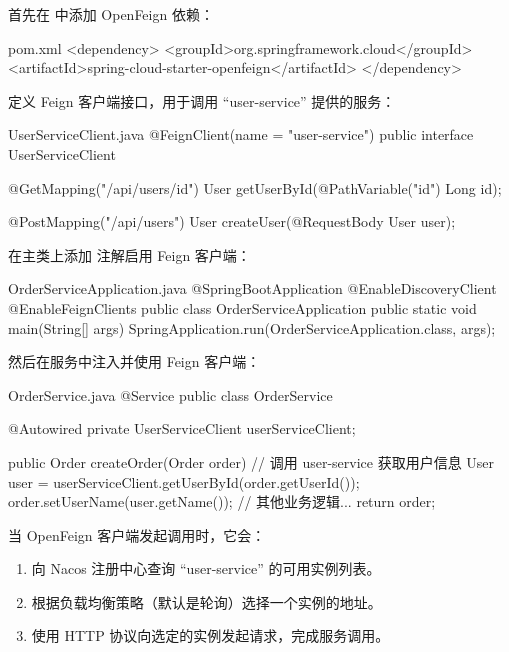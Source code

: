 首先在  中添加 OpenFeign 依赖：
\begin{codeblock}[xml]{pom.xml}
<dependency>
    <groupId>org.springframework.cloud</groupId>
    <artifactId>spring-cloud-starter-openfeign</artifactId>
</dependency>
\end{codeblock}

定义 Feign 客户端接口，用于调用 ``user-service'' 提供的服务：
\begin{codeblock}[java]{UserServiceClient.java}
@FeignClient(name = "user-service")
public interface UserServiceClient {
    
    @GetMapping("/api/users/{id}")
    User getUserById(@PathVariable("id") Long id);
    
    @PostMapping("/api/users")
    User createUser(@RequestBody User user);
}
\end{codeblock}

在主类上添加  注解启用 Feign 客户端：
\begin{codeblock}[java]{OrderServiceApplication.java}
@SpringBootApplication
@EnableDiscoveryClient
@EnableFeignClients
public class OrderServiceApplication {
    public static void main(String[] args) {
        SpringApplication.run(OrderServiceApplication.class, args);
    }
}
\end{codeblock}


然后在服务中注入并使用 Feign 客户端：
\begin{codeblock}[java]{OrderService.java}
@Service
public class OrderService {
    
    @Autowired
    private UserServiceClient userServiceClient;
    
    public Order createOrder(Order order) {
        // 调用 user-service 获取用户信息
        User user = userServiceClient.getUserById(order.getUserId());
        order.setUserName(user.getName());
        // 其他业务逻辑...
        return order;
    }
}
\end{codeblock}

当 OpenFeign 客户端发起调用时，它会：
\begin{enumerate}
    \item 向 Nacos 注册中心查询 ``user-service'' 的可用实例列表。 
    \item 根据负载均衡策略（默认是轮询）选择一个实例的地址。
    \item 使用 HTTP 协议向选定的实例发起请求，完成服务调用。
\end{enumerate}


